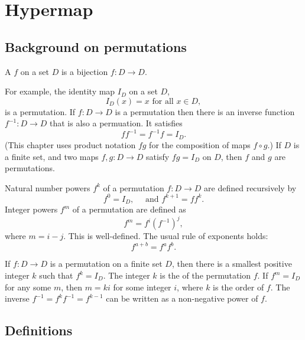 \chapter{Hypermap}\label{chap:hypermap}
%

\section{Background on permutations}

\begin{definition} A  $f$ on a set $D$ is a bijection
$f:D\to D$.
\end{definition}

For example, the identity map $I_D$ on a set $D$,
\begin{displaymath}
I_D(x)=x \text{ for all } x \in D,
\end{displaymath}
 is a permutation.
If $f:D\to D$ is a permutation then there is an inverse function $f^{-1}:D\to D$
that is also a permuation.  
It satisfies
\begin{displaymath}
f f^{-1} = f^{-1} f = I_D.
\end{displaymath}
(This chapter uses product notation $f g$ for the composition of maps
$f\circ g$.)
If $D$ is a finite set, and two maps
$f,g:D\to D$ satisfy $f g = I_D$ on $D$, then $f$ and $g$ are permutations.

Natural number powers  $f^k$ of a permutation $f:D\to D$ are defined
recursively by
\begin{displaymath}
f^0 = I_D,\quad\text{ and } f^{k+1} = f f^k.
\end{displaymath}
Integer powers $f^m$ of a permutation are defined as
$$f^m = f^i (f^{-1})^j,$$ where $m = i -j$.  This is well-defined.
The usual rule of exponents holds:
\begin{displaymath}
f^{a+b} = f^a f^b.
\end{displaymath}

If $f:D\to D$ is a permutation on a finite set $D$, then there is a smallest
positive integer $k$ such that $f^k=I_D$.  The integer $k$ is the 
of the permutation $f$.  If $f^m=I_D$ for any some $m$, then $m = k i$ for some
integer $i$, where $k$ is the order of $f$. The inverse $f^{-1} = f^k f^{-1} = f^{k-1}$ can be written as a
non-negative power of $f$.



\section{Definitions}



